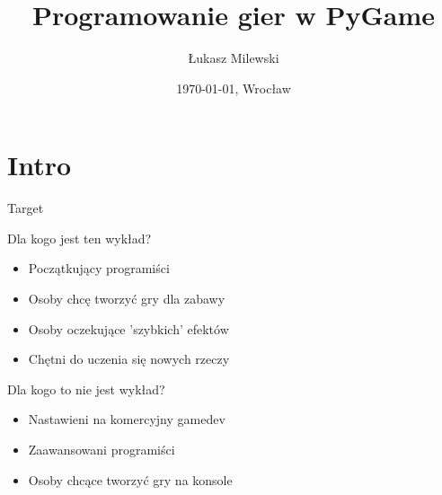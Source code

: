 \documentclass{beamer}
\title{Programowanie gier w PyGame}
\author{Łukasz Milewski}
\institute{Uniwersytet Wrocławski}
\date{\today, Wrocław}
\begin{document}
\begin{frame}
  \titlepage
\end{frame}

\begin{frame}
  \tableofcontents
\end{frame}

\section{Intro}

\begin{frame}{Target}

  \begin{block}{Dla kogo jest ten wykład?}
    \begin{itemize}
    \item Początkujący programiści
    \item Osoby chcę tworzyć gry dla zabawy
    \item Osoby oczekujące 'szybkich' efektów
    \item Chętni do uczenia się nowych rzeczy
    \end{itemize}
  \end{block}

  \begin{alertblock}{Dla kogo to nie jest wykład?}
    \begin{itemize}
    \item Nastawieni na komercyjny gamedev
    \item Zaawansowani programiści
    \item Osoby chcące tworzyć gry na konsole
    \end{itemize}
  \end{alertblock}

\end{frame}
\end{document}
